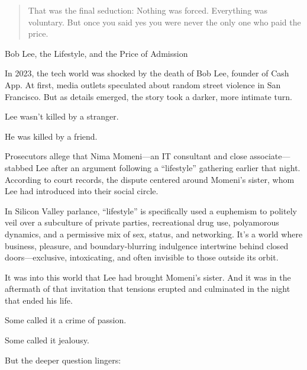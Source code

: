 \begin{quote}
That was the final seduction:  
Nothing was forced.  
Everything was voluntary.  
But once you said yes  
you were never the only one who paid the price.
\end{quote}


\begin{HistoricalSidebar}{Bob Lee, the Lifestyle, and the Price of Admission}

  In 2023, the tech world was shocked by the death of Bob Lee, founder of Cash App.  
  At first, media outlets speculated about random street violence in San Francisco.  
  But as details emerged, the story took a darker, more intimate turn.
  
  \medskip
  
  Lee wasn’t killed by a stranger.
  
  \medskip
  
  He was killed by a friend.
  
  \medskip
  
  Prosecutors allege that Nima Momeni—an IT consultant and close associate—stabbed Lee after an argument following 
  a “lifestyle” gathering earlier that night. According to court records, the dispute centered around Momeni’s sister, 
  whom Lee had introduced into their social circle.
  
  \medskip
  
  In Silicon Valley parlance, “lifestyle” is specifically used a euphemism to politely veil over a subculture of private parties, 
  recreational drug use, polyamorous dynamics, and a permissive mix of sex, status, and networking. It’s a world where 
  business, pleasure, and boundary-blurring indulgence intertwine behind closed doors—exclusive, intoxicating, and 
  often invisible to those outside its orbit.
  
  \medskip
  
  It was into this world that Lee had brought Momeni’s sister. And it was in the aftermath of that invitation that 
  tensions erupted and culminated in the night that ended his life.

  \medskip
  
  Some called it a crime of passion.

  \medskip
  
  Some called it jealousy.
  
  \medskip
  
  But the deeper question lingers:

  \medskip
  

\end{HistoricalSidebar}
